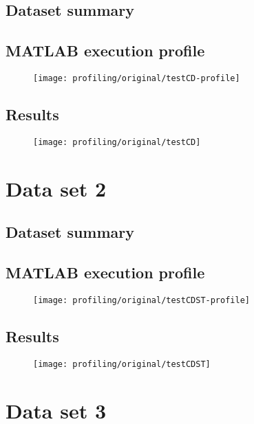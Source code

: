 \subsection{Dataset summary}

\subsection{MATLAB execution profile}
\begin{figure}[H]
	\centering
	\texttt{[image: profiling/original/testCD-profile]}
\end{figure}

\subsection{Results}
\begin{figure}[H]
	\centering
	\texttt{[image: profiling/original/testCD]}
\end{figure}

\section{Data set 2}

\subsection{Dataset summary}

\subsection{MATLAB execution profile}
\begin{figure}[H]
	\centering
	\texttt{[image: profiling/original/testCDST-profile]}
\end{figure}

\subsection{Results}
\begin{figure}[H]
	\centering
	\texttt{[image: profiling/original/testCDST]}
\end{figure}

\section{Data set 3}

